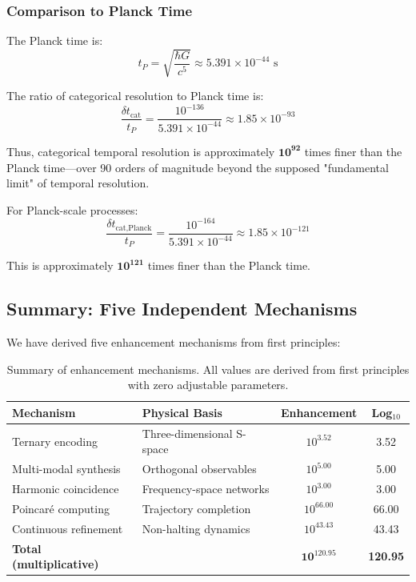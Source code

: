 \documentclass[twocolumn,10pt]{article}
\theoremstyle{remark}
\begin{document}
\subsubsection{Comparison to Planck Time}

The Planck time is:
\begin{equation}
    t_P = \sqrt{\frac{\hbar G}{c^5}} \approx 5.391 \times 10^{-44} \text{ s}
    \label{eq:planck_time_value}
\end{equation}

The ratio of categorical resolution to Planck time is:
\begin{equation}
    \frac{\delta t_{\text{cat}}}{t_P} = \frac{10^{-136}}{5.391 \times 10^{-44}} \approx 1.85 \times 10^{-93}
    \label{eq:resolution_ratio}
\end{equation}

Thus, categorical temporal resolution is approximately $\mathbf{10^{92}}$ times finer than the Planck time—over 90 orders of magnitude beyond the supposed "fundamental limit" of temporal resolution.

For Planck-scale processes:
\begin{equation}
    \frac{\delta t_{\text{cat,Planck}}}{t_P} = \frac{10^{-164}}{5.391 \times 10^{-44}} \approx 1.85 \times 10^{-121}
    \label{eq:planck_resolution_ratio}
\end{equation}

This is approximately $\mathbf{10^{121}}$ times finer than the Planck time.

\subsection{Summary: Five Independent Mechanisms}

We have derived five enhancement mechanisms from first principles:

\begin{table}[h]
\centering
\begin{tabular}{llcc}
\hline
\textbf{Mechanism} & \textbf{Physical Basis} & \textbf{Enhancement} & \textbf{Log$_{10}$} \\
\hline
Ternary encoding & Three-dimensional S-space & $10^{3.52}$ & 3.52 \\
Multi-modal synthesis & Orthogonal observables & $10^{5.00}$ & 5.00 \\
Harmonic coincidence & Frequency-space networks & $10^{3.00}$ & 3.00 \\
Poincaré computing & Trajectory completion & $10^{66.00}$ & 66.00 \\
Continuous refinement & Non-halting dynamics & $10^{43.43}$ & 43.43 \\
\hline
\textbf{Total (multiplicative)} & & $\mathbf{10^{120.95}}$ & \textbf{120.95} \\
\hline
\end{tabular}
\caption{Summary of enhancement mechanisms. All values are derived from first principles with zero adjustable parameters.}
\label{tab:enhancement_summary}
\end{table}
\end{document}
